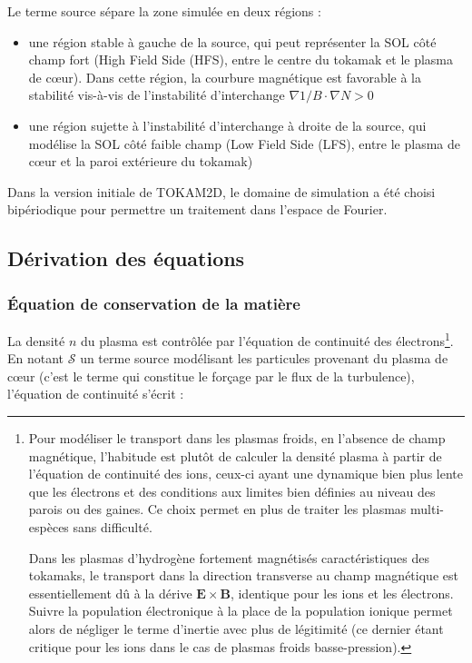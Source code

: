 \begin{refsection}
Le terme source sépare la zone
simulée en deux régions :

\begin{itemize}
  \item une région stable à gauche
  de la source, qui peut représenter la SOL côté champ fort (High Field
  Side (HFS), entre le centre du tokamak et le plasma de c\oe ur). Dans cette
  région, la courbure magnétique est favorable à la stabilité vis-à-vis de l'instabilité
  d'interchange $\nabla 1/B\cdot\nabla N>0$
  \item une région sujette à l'instabilité d'interchange à
  droite de la source, qui modélise la SOL côté faible champ (Low Field Side
  (LFS), entre le plasma de c\oe ur et la paroi extérieure du tokamak)
 \end{itemize}
 
Dans la version initiale de TOKAM2D, le domaine de simulation a été choisi
bipériodique pour permettre un traitement dans l'espace
de Fourier.

\subsection{Dérivation des équations}
\subsubsection{Équation de conservation de la matière}
La densité $n$ du plasma est contrôlée par l'équation de continuité des
électrons\footnote{Pour modéliser le transport dans les plasmas froids, en
l'absence de champ magnétique, l'habitude est plutôt de calculer la densité
plasma à partir de l'équation de continuité des ions, ceux-ci ayant une
dynamique bien plus lente que les électrons et des conditions aux limites
bien définies au niveau des parois ou des gaines. Ce choix permet en plus de
traiter les plasmas multi-espèces sans difficulté.

Dans les plasmas d'hydrogène fortement magnétisés caractéristiques des tokamaks,
le transport dans la direction transverse au champ magnétique est
essentiellement dû à la dérive $\mathbf E\times\mathbf B$, identique pour les
ions et les électrons. Suivre la population électronique à la place de la
population ionique permet alors de négliger le terme d'inertie avec plus de
légitimité (ce dernier étant critique pour les ions dans le cas de plasmas
froids basse-pression).}.
En notant $\mathcal{S}$ un
terme source modélisant les particules provenant du plasma de
c\oe{}ur (c'est le terme qui constitue le forçage par le flux de la turbulence),
l'équation de continuité s'écrit :


\end{refsection}
